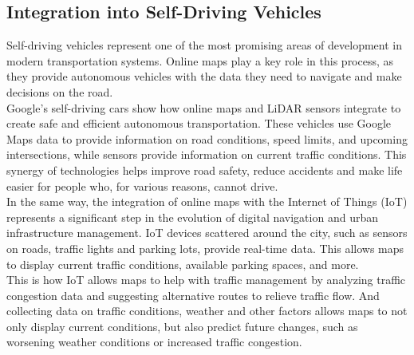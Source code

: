 \documentclass[10pt,oneside,english,a4paper]{article}
\begin{document}
\subsection{Integration into Self-Driving Vehicles} \label{future:vehicles}
Self-driving vehicles represent one of the most promising areas of development in modern transportation systems. Online maps play a key role in this process, as they provide autonomous vehicles with the data they need to navigate and make decisions on the road.
\\Google's self-driving cars \cite{NovakSelfDriving} show how online maps and LiDAR sensors integrate to create safe and efficient autonomous transportation. These vehicles use Google Maps data to provide information on road conditions, speed limits, and upcoming intersections, while sensors provide information on current traffic conditions. This synergy of technologies helps improve road safety, reduce accidents and make life easier for people who, for various reasons, cannot drive.
\\In the same way, the integration of online maps with the Internet of Things (IoT) represents a significant step in the evolution of digital navigation and urban infrastructure management. IoT devices scattered around the city, such as sensors on roads, traffic lights and parking lots, provide real-time data. This allows maps to display current traffic conditions, available parking spaces, and more. 
\\This is how IoT allows maps to help with traffic management by analyzing traffic congestion data and suggesting alternative routes to relieve traffic flow. And collecting data on traffic conditions, weather and other factors allows maps to not only display current conditions, but also predict future changes, such as worsening weather conditions or increased traffic congestion.
\end{document}
